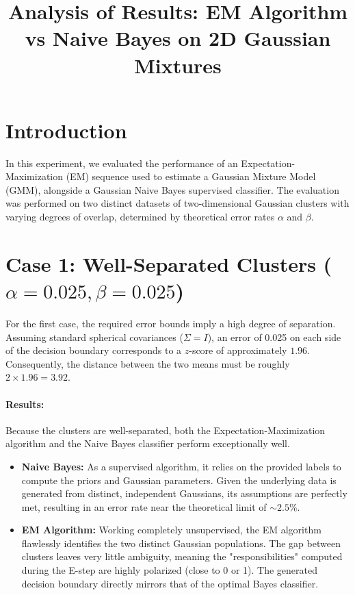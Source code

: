 \documentclass{article}
\title{Analysis of Results: EM Algorithm vs Naive Bayes on 2D Gaussian Mixtures}
\author{}
\date{}
\begin{document}
\maketitle

\section{Introduction}
In this experiment, we evaluated the performance of an Expectation-Maximization (EM) sequence used to estimate a Gaussian Mixture Model (GMM), alongside a Gaussian Naive Bayes supervised classifier. The evaluation was performed on two distinct datasets of two-dimensional Gaussian clusters with varying degrees of overlap, determined by theoretical error rates $\alpha$ and $\beta$.

\section{Case 1: Well-Separated Clusters ($\alpha = 0.025, \beta = 0.025$)}
For the first case, the required error bounds imply a high degree of separation. Assuming standard spherical covariances ($\Sigma = I$), an error of 0.025 on each side of the decision boundary corresponds to a $z$-score of approximately $1.96$. Consequently, the distance between the two means must be roughly $2 \times 1.96 = 3.92$. 

\paragraph{Results:}
Because the clusters are well-separated, both the Expectation-Maximization algorithm and the Naive Bayes classifier perform exceptionally well. 
\begin{itemize}
    \item \textbf{Naive Bayes:} As a supervised algorithm, it relies on the provided labels to compute the priors and Gaussian parameters. Given the underlying data is generated from distinct, independent Gaussians, its assumptions are perfectly met, resulting in an error rate near the theoretical limit of $\sim 2.5\%$.
    \item \textbf{EM Algorithm:} Working completely unsupervised, the EM algorithm flawlessly identifies the two distinct Gaussian populations. The gap between clusters leaves very little ambiguity, meaning the "responsibilities" computed during the E-step are highly polarized (close to 0 or 1). The generated decision boundary directly mirrors that of the optimal Bayes classifier.
\end{itemize}
\end{document}
